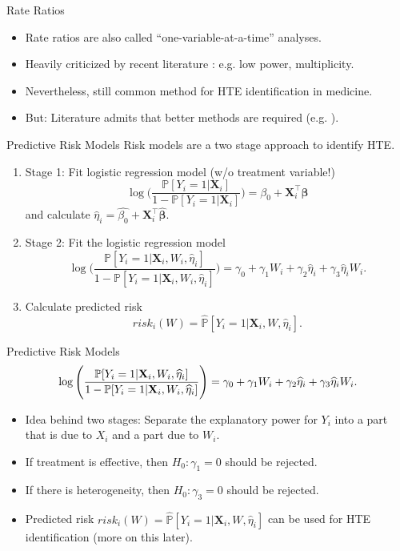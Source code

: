 \documentclass[11pt]{beamer}
\newcommand{\X}{\mathbf{X}}
\renewcommand{\P}{\mathbb{P}}
\begin{document}
\begin{frame}{Rate Ratios}
\begin{itemize}\setlength\itemsep{1em}
	\item Rate ratios are also called ``one-variable-at-a-time'' analyses.
	\item Heavily criticized by recent literature \citep{kent2020path}: e.g. low power, multiplicity.
	\item Nevertheless, still common method for HTE identification in medicine.
	\item But: Literature admits that better methods are required (e.g. \citealp{kent2020path}).
\end{itemize}
\end{frame}


\begin{frame}{Predictive Risk Models}
Risk models \citep{kent2020path} are a two stage approach to identify HTE.
\begin{enumerate}
	\item Stage 1: Fit logistic regression model (w/o treatment variable!)
	\[
	\log \Bigg( \frac{\P[Y_i = 1 | \X_i]}{1 - \P[Y_i = 1 | \X_i]} \Bigg)
	=
	\beta_0 + \X_i^\top \bm{\beta}
	\]
	and calculate $\widehat{\eta}_i = \widehat{\beta_0} + \X_i^\top \widehat{\bm{\beta}}$.
	\item Stage 2: Fit the logistic regression model
	\[
	\log \Bigg( \frac{\P[Y_i = 1 | \X_i, W_i, \widehat{\eta}_i]}{1 - \P[Y_i = 1 | \X_i, W_i, \widehat{\eta}_i]} \Bigg)
	=
	\gamma_0 + \gamma_1 W_i + \gamma_2 \widehat{\eta}_i + \gamma_3 \widehat{\eta}_i W_i.
	\]
	\item Calculate predicted risk \[risk_i(W) = \widehat{\P}[Y_i = 1 | \X_i, W, \widehat{\eta}_i].\]
\end{enumerate}
\end{frame}


\begin{frame}{Predictive Risk Models}
\[
	\log \Bigg( \frac{\P[Y_i = 1 | \X_i, W_i, \widehat{\eta}_i]}{1 - \P[Y_i = 1 | \X_i, W_i, \widehat{\eta}_i]} \Bigg)
	=
	\gamma_0 + \gamma_1 W_i + \gamma_2 \widehat{\eta}_i + \gamma_3 \widehat{\eta}_i W_i.\bigskip
	\]
\begin{itemize}\setlength\itemsep{1em}
	\item Idea behind two stages: Separate the explanatory power for $Y_i$ into a part that is due to $X_i$ and a part due to $W_i$.
	\item If treatment is effective, then $H_0: \gamma_1 = 0$ should be rejected.
	\item If there is heterogeneity, then $H_0: \gamma_3 = 0$ should be rejected.
	\item Predicted risk $risk_i(W) = \widehat{\P}[Y_i = 1 | \X_i, W, \widehat{\eta}_i]$ can be used for HTE identification (more on this later).
\end{itemize}
\end{frame}
\end{document}
